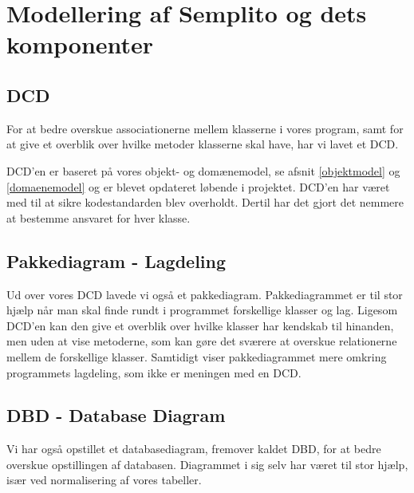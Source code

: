 \section{Modellering af Semplito og dets komponenter}
\subsection{DCD}
\label{DCD}

For at bedre overskue associationerne mellem klasserne i vores program, samt for at give et overblik over hvilke metoder klasserne skal have, har vi lavet et DCD. 

DCD'en er baseret på vores objekt- og domænemodel, se afsnit \ref{objektmodel} og \ref{domaenemodel} og er blevet opdateret løbende i projektet. DCD'en har været med til at sikre kodestandarden blev overholdt. Dertil har det gjort det nemmere at bestemme ansvaret for hver klasse.


\subsection{Pakkediagram - Lagdeling}
\label{Pakkediagram}

Ud over vores DCD lavede vi også et pakkediagram. Pakkediagrammet er til stor hjælp når man skal finde rundt i programmet forskellige klasser og lag. Ligesom DCD'en kan den give et overblik over hvilke klasser har kendskab til hinanden, men uden at vise metoderne, som kan gøre det sværere at overskue relationerne mellem de forskellige klasser. Samtidigt viser pakkediagrammet mere omkring programmets lagdeling, som ikke er meningen med en DCD.


\subsection{DBD - Database Diagram}
\label{DBD}

Vi har også opstillet et databasediagram, fremover kaldet DBD, for at bedre overskue opstillingen af databasen. Diagrammet i sig selv har været til stor hjælp, især ved normalisering af vores tabeller. 




